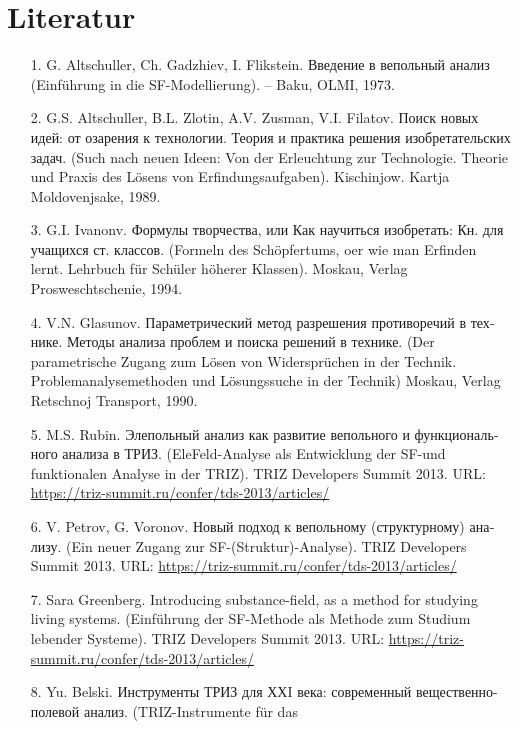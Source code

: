 \documentclass[11pt,a4paper]{article}
\begin{document}
\section*{Literatur}
\begin{itemize}
\item[1.] G. Altschuller, Ch. Gadzhiev, I. Flikstein.
  \foreignlanguage{russian}{Введение в вепольный анализ} (Einführung in die
  SF-Modellierung). – Baku, OLMI, 1973.
\item[2.] G.S. Altschuller, B.L. Zlotin, A.V. Zusman, V.I. Filatov.
  \foreignlanguage{russian}{Поиск новых идей: от озарения к технологии. Теория
    и практика решения изобретательских задач.}  (Such nach neuen Ideen: Von
  der Erleuchtung zur Technologie. Theorie und Praxis des Lösens von
  Erfindungsaufgaben). Kischinjow. Kartja Moldovenjsake, 1989.
\item[3.] G.I. Ivanonv. \foreignlanguage{russian}{Формулы творчества, или Как
  научиться изобретать: Кн.  для учащихся ст. классов.} (Formeln des
  Schöpfertums, oer wie man Erfinden lernt. Lehrbuch für Schüler höherer
  Klassen). Moskau, Verlag Prosweschtschenie, 1994.
\item[4.] V.N. Glasunov. \foreignlanguage{russian}{Параметрический метод
  разрешения противоречий в технике. Методы анализа проблем и поиска решений в
  технике.} (Der parametrische Zugang zum Lösen von Widersprüchen in der
  Technik.  Problemanalysemethoden und Lösungssuche in der Technik) Moskau,
  Verlag Retschnoj Transport, 1990.
\item[5.] M.S. Rubin. \foreignlanguage{russian}{Элепольный анализ как развитие
  вепольного и функционального анализа в ТРИЗ}. (EleFeld-Analyse als
  Entwicklung der SF-und funktionalen Analyse in der TRIZ). TRIZ Developers
  Summit 2013.  URL: \url{https://triz-summit.ru/confer/tds-2013/articles/}
\item[6.] V. Petrov, G. Voronov. \foreignlanguage{russian}{Новый подход к
  вепольному (структурному) анализу}. (Ein neuer Zugang zur
  SF-(Struktur)-Analyse).  TRIZ Developers Summit 2013.  URL:
  \url{https://triz-summit.ru/confer/tds-2013/articles/}
\item[7.] Sara Greenberg. Introducing substance-field, as a method for
  studying living systems. (Einführung der SF-Methode als Methode zum Studium
  lebender Systeme). TRIZ Developers Summit 2013.  URL:
  \url{https://triz-summit.ru/confer/tds-2013/articles/}
\item[8.] Yu. Belski. \foreignlanguage{russian}{Инструменты ТРИЗ для ХХI века:
  современный вещественно-полевой анализ}. (TRIZ-Instrumente für das

\end{itemize}
\end{document}
